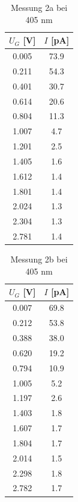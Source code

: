 \documentclass{article}
\begin{document}
\begin{table}[h!]
  \centering
  \begin{tabular}{|c|c|}
      \hline
      $U_G$ [V] & $I$ [pA] \\
      \hline
      0.005  & 73.9 \\
      0.211  & 54.3 \\
      0.401  & 30.7 \\
      0.614  & 20.6 \\
      0.804  & 11.3 \\
      1.007  & 4.7  \\
      1.201  & 2.5  \\
      1.405  & 1.6  \\
      1.612  & 1.4  \\
      1.801  & 1.4  \\
      2.024  & 1.3  \\
      2.304  & 1.3  \\
      2.781  & 1.4  \\
      \hline
  \end{tabular}
  \caption{Messung 2a bei 405 nm}
  \label{tab:messung365}
\end{table}

\begin{table}[h!]
  \centering
  \begin{tabular}{|c|c|}
      \hline
      $U_G$ [V] & $I$ [pA] \\
      \hline
      0.007  & 69.8 \\
      0.212  & 53.8 \\
      0.388  & 38.0 \\
      0.620  & 19.2 \\
      0.794  & 10.9 \\
      1.005  & 5.2  \\
      1.197  & 2.6  \\
      1.403  & 1.8  \\
      1.607  & 1.7  \\
      1.804  & 1.7  \\
      2.014  & 1.5  \\
      2.298  & 1.8  \\
      2.782  & 1.7  \\
      \hline
  \end{tabular}
  \caption{Messung 2b bei 405 nm}
  \label{tab:messung405}
\end{table}
\end{document}
